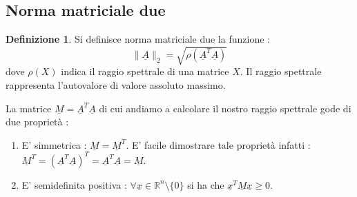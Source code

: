 \documentclass[12pt, a4paper]{book}
\theoremstyle{definition}
\newtheorem{defn}{Definizione}[section]
\newcommand{\VarMtrx}[1]{\ensuremath{\underline{#1}}}
\begin{document}
\subsection{Norma matriciale due}
\begin{flushleft}
\begin{defn}
Si definisce norma matriciale due la funzione :
\[ \lVert\VarMtrx{A}\rVert_{2} = \sqrt{\rho(\VarMtrx{A}^{T}\VarMtrx{A})} \]
dove $\rho(X)$ indica il raggio spettrale di una matrice $X$. Il raggio spettrale rappresenta l'autovalore di valore assoluto massimo. 
\end{defn}

La matrice $\VarMtrx{M}=\VarMtrx{A}^{T}\VarMtrx{A}$ di cui andiamo a calcolare il nostro raggio spettrale gode di due proprietà : 
\begin{enumerate}
	\item E' simmetrica : $\VarMtrx{M} = \VarMtrx{M}^{T}$.  E' facile dimostrare tale proprietà infatti : $\VarMtrx{M}^{T} = (\VarMtrx{A}^{T}\VarMtrx{A})^{T} = \VarMtrx{A}^{T}\VarMtrx{A} = \VarMtrx{M} $. 
	\item E' semidefinita positiva : $\forall \VarMtrx{x} \in \mathbb{R}^{n} \setminus \{0\}$ si ha che $\VarMtrx{x}^{T}\VarMtrx{M}\VarMtrx{x} \geq 0$.
\end{enumerate}
\end{flushleft}
\end{document}
